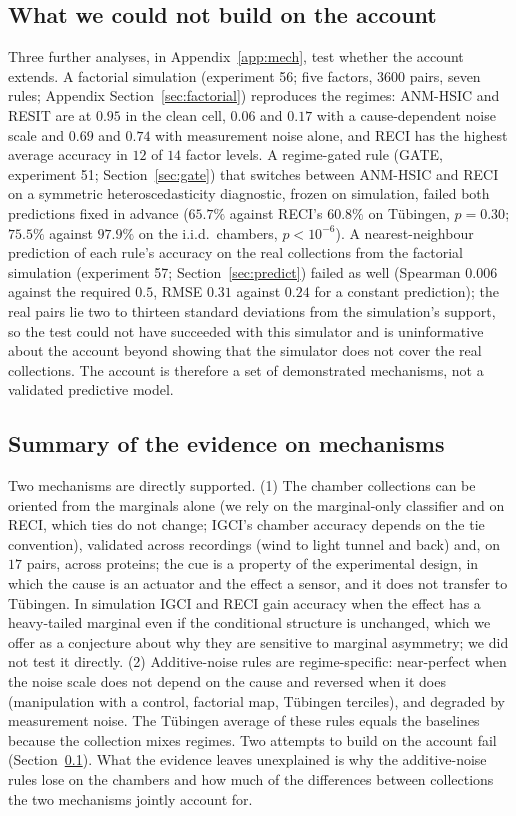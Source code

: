 \subsection{What we could not build on the account}\label{sec:negative_mech}
Three further analyses, in Appendix~\ref{app:mech}, test whether the account extends. A factorial simulation (experiment 56; five factors, $3600$ pairs, seven rules; Appendix Section~\ref{sec:factorial}) reproduces the regimes: ANM-HSIC and RESIT are at $0.95$ in the clean cell, $0.06$ and $0.17$ with a cause-dependent noise scale and $0.69$ and $0.74$ with measurement noise alone, and RECI has the highest average accuracy in $12$ of $14$ factor levels. A regime-gated rule (GATE, experiment 51; Section~\ref{sec:gate}) that switches between ANM-HSIC and RECI on a symmetric heteroscedasticity diagnostic, frozen on simulation, failed both predictions fixed in advance ($65.7\%$ against RECI's $60.8\%$ on T\"ubingen, $p=0.30$; $75.5\%$ against $97.9\%$ on the i.i.d.\ chambers, $p<10^{-6}$). A nearest-neighbour prediction of each rule's accuracy on the real collections from the factorial simulation (experiment 57; Section~\ref{sec:predict}) failed as well (Spearman $0.006$ against the required $0.5$, RMSE $0.31$ against $0.24$ for a constant prediction); the real pairs lie two to thirteen standard deviations from the simulation's support, so the test could not have succeeded with this simulator and is uninformative about the account beyond showing that the simulator does not cover the real collections. The account is therefore a set of demonstrated mechanisms, not a validated predictive model.

\subsection{Summary of the evidence on mechanisms}
Two mechanisms are directly supported. (1) The chamber collections can be oriented from the marginals alone (we rely on the marginal-only classifier and on RECI, which ties do not change; IGCI's chamber accuracy depends on the tie convention), validated across recordings (wind to light tunnel and back) and, on $17$ pairs, across proteins; the cue is a property of the experimental design, in which the cause is an actuator and the effect a sensor, and it does not transfer to T\"ubingen. In simulation IGCI and RECI gain accuracy when the effect has a heavy-tailed marginal even if the conditional structure is unchanged, which we offer as a conjecture about why they are sensitive to marginal asymmetry; we did not test it directly. (2) Additive-noise rules are regime-specific: near-perfect when the noise scale does not depend on the cause and reversed when it does (manipulation with a control, factorial map, T\"ubingen terciles), and degraded by measurement noise. The T\"ubingen average of these rules equals the baselines because the collection mixes regimes. Two attempts to build on the account fail (Section~\ref{sec:negative_mech}). What the evidence leaves unexplained is why the additive-noise rules lose on the chambers and how much of the differences between collections the two mechanisms jointly account for.
